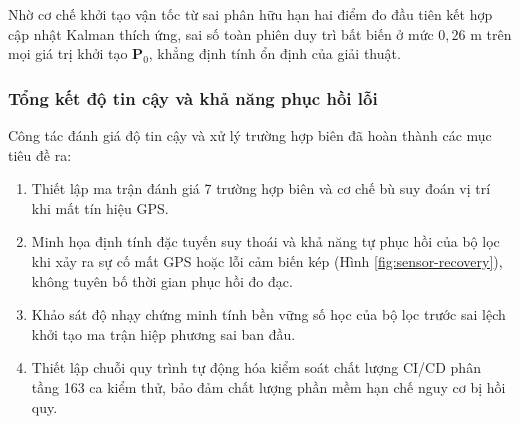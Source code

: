 Nhờ cơ chế khởi tạo vận tốc từ sai phân hữu hạn hai điểm đo đầu tiên kết hợp cập nhật Kalman thích ứng, sai số toàn phiên duy trì bất biến ở mức $0{,}26$ m trên mọi giá trị khởi tạo $\mathbf{P}_0$, khẳng định tính ổn định của giải thuật.

\subsubsection{Tổng kết độ tin cậy và khả năng phục hồi lỗi}

\hspace{0.5cm} Công tác đánh giá độ tin cậy và xử lý trường hợp biên đã hoàn thành các mục tiêu đề ra:
\begin{enumerate}
    \item Thiết lập ma trận đánh giá 7 trường hợp biên và cơ chế bù suy đoán vị trí khi mất tín hiệu GPS.
    \item Minh họa định tính đặc tuyến suy thoái và khả năng tự phục hồi của bộ lọc khi xảy ra sự cố mất GPS hoặc lỗi cảm biến kép (Hình \ref{fig:sensor-recovery}), không tuyên bố thời gian phục hồi đo đạc.
        \item Khảo sát độ nhạy chứng minh tính bền vững số học của bộ lọc trước sai lệch khởi tạo ma trận hiệp phương sai ban đầu.
    \item Thiết lập chuỗi quy trình tự động hóa kiểm soát chất lượng CI/CD phân tầng 163 ca kiểm thử, bảo đảm chất lượng phần mềm hạn chế nguy cơ bị hồi quy.
\end{enumerate}
